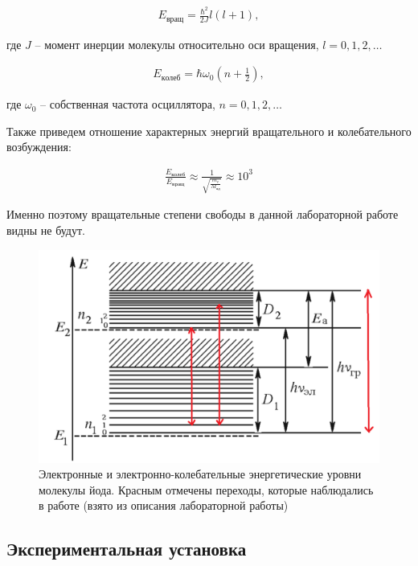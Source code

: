 \documentclass[a4paper,12pt]{article}
\begin{document}
\begin{align*}
	E_{вращ} = \frac{\hbar^2}{2J} l(l+1), 
\end{align*}

где $J$ -- момент инерции молекулы относительно оси вращения, $l = 0, 1, 2, \dots$

\begin{align*}
	E_{колеб} = \hbar \omega_0 \left( n + \frac{1}{2} \right),
\end{align*}

где $\omega_0$ -- собственная частота осциллятора, $n = 0, 1, 2, \dots$

Также приведем отношение характерных энергий вращательного и колебательного возбуждения:

\begin{align*}
	\frac{E_{колеб}}{E_{вращ}} \approx \frac{1}{\sqrt{\frac{m_e}{M_{яд}}}} \approx 10^3
\end{align*}

Именно поэтому вращательные степени свободы в данной лабораторной работе видны не будут.

\begin{figure}[h!]
	\centering
	\includegraphics[width=0.8\linewidth]{Oscillating_levels}
	\caption{Электронные и электронно-колебательные энергетические уровни молекулы йода. Красным отмечены переходы, которые наблюдались в работе (взято из описания лабораторной работы)}
	\label{fig1:osc_lvl}
\end{figure}


\pagebreak

\subsection*{Экспериментальная установка}
\end{document}
